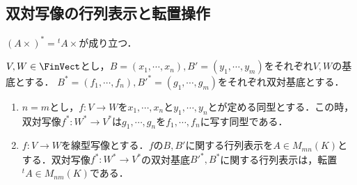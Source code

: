 \documentclass[uplatex, dvipdfmx]{jsreport}
\begin{document}
\subsection{双対写像の行列表示と転置操作}

\begin{tcolorbox}[colframe=ForestGreen, colback=ForestGreen!10!white, breakable,
    title=双対写像の行列表示]
    $(A\times)^*={}^t\!A\times$が成り立つ．
\end{tcolorbox}

\begin{proposition}[双対写像の行列表示]\label{prop-matrix-representation-of-dual-map}
    $V,W\in\FinVect$とし，$B=(x_1,\cdots,x_n),B'=(y_1,\cdots,y_m)$をそれぞれ$V,W$の基底とする．
    $B^*=(f_1,\cdots,f_n),B'^*=(g_1,\cdots,g_m)$をそれぞれ双対基底とする．
    \begin{enumerate}
        \item $n=m$とし，$f:V\to W$を$x_1,\cdots,x_n$と$y_1,\cdots,y_n$とが定める同型とする．この時，双対写像$f^*:W^*\to V^*$は$g_1,\cdots,g_n$を$f_1,\cdots,f_n$に写す同型である．
        \item $f:V\to W$を線型写像とする．$f$の$B,B'$に関する行列表示を$A\in M_{mn}(K)$とする．双対写像$f^*:W^*\to V^*$の双対基底$B'^*,B^*$に関する行列表示は，転置${}^t\!A\in M_{nm}(K)$である．
    \end{enumerate}
\end{proposition}
\end{document}

